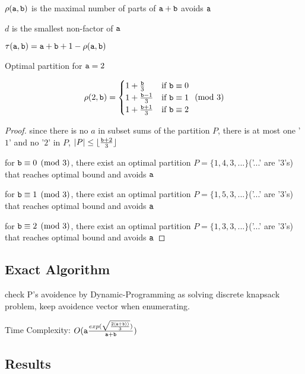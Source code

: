 \begin{definition}
$\rho(\mathtt{a},\mathtt{b})$ is the maximal number of parts of $\mathtt{a}+\mathtt{b}$ avoids $\mathtt{a}$

$d$ is the smallest non-factor of $\mathtt{a}$
\end{definition}

\begin{remark}
$\tau(\mathtt{a},\mathtt{b})=\mathtt{a}+\mathtt{b}+1-\rho(\mathtt{a},\mathtt{b})$
\end{remark}

\begin{theorem}
Optimal partition for $\mathtt{a}=2$

\[
 \rho(2,\mathtt{b}) =
   \begin{cases}
     1+\frac{\mathtt{b}}{3}   &\mbox{if }\mathtt{b}\equiv0\\
     1+\frac{\mathtt{b}-1}{3} &\mbox{if }\mathtt{b}\equiv1\\
     1+\frac{\mathtt{b}+1}{3} &\mbox{if }\mathtt{b}\equiv2
   \end{cases}
   \pmod{3}
\]
\end{theorem}

\begin{proof}
	since there is no $a$ in subset sums of the partition $P$, there is at most one '$1$' and no '$2$' in $P$, $|P|\leq \lfloor\frac{\mathtt{b}+2}{3}\rfloor$

	for $\mathtt{b}\equiv0\pmod{3}$, there exist an optimal partition $P=\{1,4,3,...\}$('...' are '$3$'s) that reaches optimal bound and avoids $\mathtt{a}$

	for $\mathtt{b}\equiv1\pmod{3}$, there exist an optimal partition $P=\{1,5,3,...\}$('...' are '$3$'s) that reaches optimal bound and avoids $\mathtt{a}$

	for $\mathtt{b}\equiv2\pmod{3}$, there exist an optimal partition $P=\{1,3,3,...\}$('...' are '$3$'s) that reaches optimal bound and avoids $\mathtt{a}$

\end{proof}


\subsection{Exact Algorithm}

\begin{algorithmic}
     
    \ENDIF
  \ENDFOR
\end{algorithmic}
check P's avoidence by Dynamic-Programming as solving discrete knapsack problem, keep avoidence vector when enumerating.

Time Complexity: $O(\mathtt{a}\frac{exp(\sqrt{\frac{2(\mathtt{a}+\mathtt{b}))}{3} } )}{\mathtt{a}+\mathtt{b}})$

\subsection{Results}

